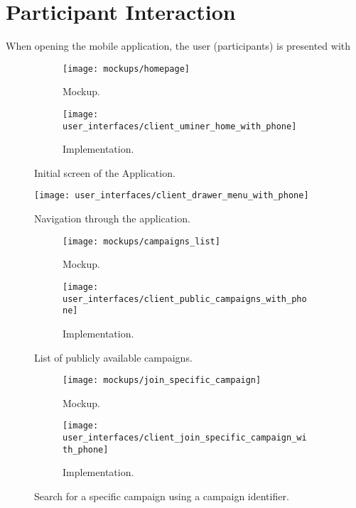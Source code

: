 
\section{Participant Interaction}

When opening the mobile application, the user (participants) is presented with  

\begin{figure}
\begin{subfigure}[!t]{.48\textwidth}
  \centering
  \texttt{[image: mockups/homepage]}
  \caption{Mockup.}
  \label{fig:mockup_initial_screen}
\end{subfigure}%
\begin{subfigure}[!t]{.52\textwidth}
  \centering
  \texttt{[image: user\_interfaces/client\_uminer\_home\_with\_phone]}
  \caption{Implementation.}
  \label{fig:implementation_initial_screen}
\end{subfigure}
\caption{Initial screen of the Application.}
\label{fig:initial_screen}
\end{figure}
\FloatBarrier

\begin{figure}
\centering
\texttt{[image: user\_interfaces/client\_drawer\_menu\_with\_phone]}
\caption{Navigation through the application.}
\label{fig:navigation}
\end{figure}
\FloatBarrier

\begin{figure}
\begin{subfigure}[!t]{.48\textwidth}
  \centering
  \texttt{[image: mockups/campaigns\_list]}
  \caption{Mockup.}
  \label{fig:mockup_public_campaigns}
\end{subfigure}%
\begin{subfigure}[!t]{.52\textwidth}
  \centering
  \texttt{[image: user\_interfaces/client\_public\_campaigns\_with\_phone]}
  \caption{Implementation.}
  \label{fig:implementation_public_campaigns}
\end{subfigure}
\caption{List of publicly available campaigns.}
\label{fig:public_campaigns}
\end{figure}
\FloatBarrier

\begin{figure}
\begin{subfigure}[!t]{.48\textwidth}
  \centering
  \texttt{[image: mockups/join\_specific\_campaign]}
  \caption{Mockup.}
  \label{fig:mockup_specific_campaign}
\end{subfigure}%
\begin{subfigure}[!t]{.52\textwidth}
  \centering
  \texttt{[image: user\_interfaces/client\_join\_specific\_campaign\_with\_phone]}
  \caption{Implementation.}
  \label{fig:implementation_specific_campaign}
\end{subfigure}
\caption{Search for a specific campaign using a campaign identifier.}
\label{fig:specific_campaign}
\end{figure}
\FloatBarrier


